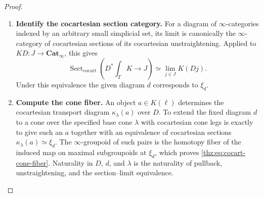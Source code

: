 \documentclass[oneside]{article}
\theoremstyle{plain}
\theoremstyle{definition}
\theoremstyle{remark}
\newcommand{\Cat}{\mathbf{Cat}_{\infty}}
\newcommand{\coc}{\mathrm{cocart}}
\begin{document}
\begin{proof}
\leavevmode
\begin{enumerate}
\item \textbf{Identify the cocartesian section category.} For a diagram of $\infty$-categories indexed by an arbitrary small
simplicial set, its limit is canonically the $\infty$-category of
cocartesian sections of its cocartesian unstraightening.
\cite[Cor.~3.3.3.2, dual form]{Lurie2009}
Applied to $KD:J\to\Cat$, this gives
\[
 \operatorname{Sect}_{\coc}
 \left(D^*\!\int_TK\longrightarrow J\right)
 \simeq
 \lim_{j\in J}K(Dj).
\]
Under this equivalence the given diagram $d$ corresponds to $\xi_d$.
\item \textbf{Compute the cone fiber.} An object $a\in K(\ell)$ determines the cocartesian transport diagram
$\kappa_\lambda(a)$ over $D$.  To extend the fixed diagram $d$ to a cone
over the specified base cone $\lambda$ with cocartesian cone legs is exactly
to give such an $a$ together with an equivalence of cocartesian sections $\kappa_\lambda(a)\simeq\xi_d.$ The $\infty$-groupoid of such pairs is the homotopy fiber of the induced
map on maximal subgroupoids at $\xi_d$, which proves
\eqref{thz:eq:cocart-cone-fiber}.  Naturality in $D$, $d$, and $\lambda$
is the naturality of pullback, unstraightening, and the section--limit
equivalence.\qedhere
\end{enumerate}
\end{proof}
\end{document}
